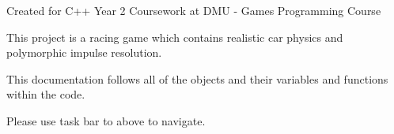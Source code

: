Created for C++ Year 2 Coursework at D\+M\+U -\/ Games Programming Course

This project is a racing game which contains realistic car physics and polymorphic impulse resolution.

This documentation follows all of the objects and their variables and functions within the code.

Please use task bar to above to navigate. 